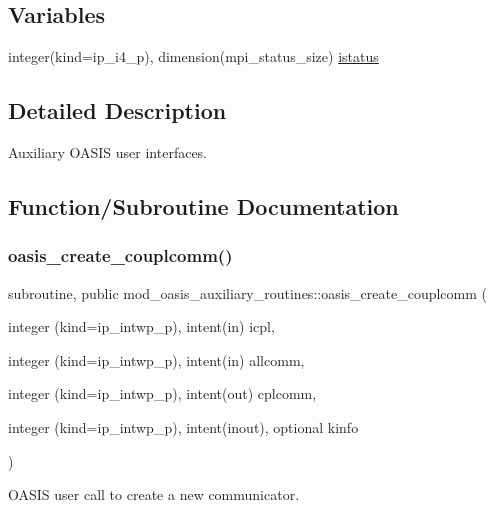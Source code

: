 \subsection*{Variables}
\begin{DoxyCompactItemize}
\item 
integer(kind=ip\+\_\+i4\+\_\+p), dimension(mpi\+\_\+status\+\_\+size) \hyperlink{namespacemod__oasis__auxiliary__routines_a284fcb0384dbbf081a6930256fc12b27}{istatus}
\end{DoxyCompactItemize}


\subsection{Detailed Description}
Auxiliary O\+A\+S\+IS user interfaces. 

\subsection{Function/\+Subroutine Documentation}
\mbox{\label{namespacemod__oasis__auxiliary__routines_aede33b301679f532ecd300488358ab71}} 
\subsubsection{\texorpdfstring{oasis\+\_\+create\+\_\+couplcomm()}{oasis\_create\_couplcomm()}}
{\footnotesize\ttfamily subroutine, public mod\+\_\+oasis\+\_\+auxiliary\+\_\+routines\+::oasis\+\_\+create\+\_\+couplcomm (\begin{DoxyParamCaption}\item[{integer (kind=ip\+\_\+intwp\+\_\+p), intent(in)}]{icpl,  }\item[{integer (kind=ip\+\_\+intwp\+\_\+p), intent(in)}]{allcomm,  }\item[{integer (kind=ip\+\_\+intwp\+\_\+p), intent(out)}]{cplcomm,  }\item[{integer (kind=ip\+\_\+intwp\+\_\+p), intent(inout), optional}]{kinfo }\end{DoxyParamCaption})}



O\+A\+S\+IS user call to create a new communicator. 


